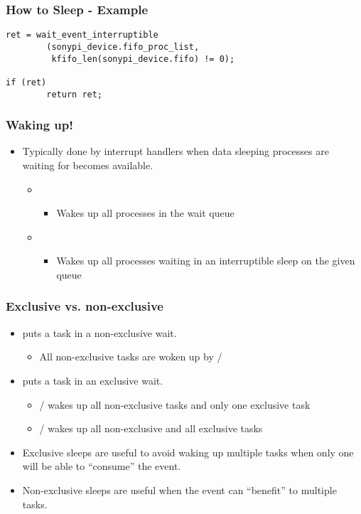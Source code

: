 \begin{frame}[fragile]
\frametitle{How to Sleep - Example}
\begin{verbatim}
ret = wait_event_interruptible
        (sonypi_device.fifo_proc_list,
         kfifo_len(sonypi_device.fifo) != 0);

if (ret)
        return ret;
\end{verbatim}
\end{frame}

\begin{frame}
  \frametitle{Waking up!}
  \begin{itemize}
  \item Typically done by interrupt handlers when data sleeping
    processes are waiting for becomes available.
    \begin{itemize}
    \item {}
      \begin{itemize}
      \item Wakes up all processes in the wait queue
      \end{itemize}
    \item {}
      \begin{itemize}
      \item Wakes up all processes waiting in an interruptible sleep
        on the given queue
      \end{itemize}
    \end{itemize}
  \end{itemize}
\end{frame}

\begin{frame}
  \frametitle{Exclusive vs. non-exclusive}
  \begin{itemize}
  \item {} puts a task in a
    non-exclusive wait.
    \begin{itemize}
    \item All non-exclusive tasks are woken up by  /
    \end{itemize}
  \item {} puts a task in an
    exclusive wait.
    \begin{itemize}
    \item {} /  wakes up
      all non-exclusive tasks and only one exclusive task
    \item {} / 
      wakes up all non-exclusive and all exclusive tasks
    \end{itemize}
  \item Exclusive sleeps are useful to avoid waking up multiple tasks
    when only one will be able to ``consume'' the event.
  \item Non-exclusive sleeps are useful when the event can ``benefit''
    to multiple tasks.
  \end{itemize}
\end{frame}


